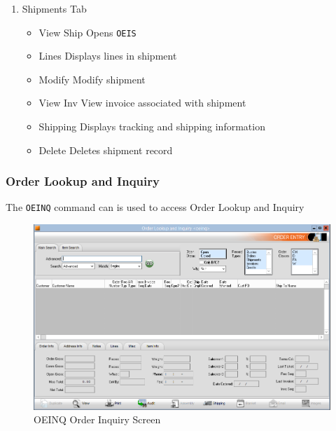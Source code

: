 \begin{enumerate}
	\item Shipments Tab
	\begin{itemize}
		\item View Ship \textemdash Opens \texttt{OEIS}
		\item Lines \textemdash Displays lines in shipment
		\item Modify \textemdash Modify shipment
		\item View Inv \textemdash View invoice associated with shipment
		\item Shipping \textemdash Displays tracking and shipping information
		\item Delete \textemdash Deletes shipment record
	\end{itemize}
\end{enumerate}

\subsubsection{Order Lookup and Inquiry}


The \texttt{OEINQ} command can is used to access Order Lookup and Inquiry

\begin{figure}[H]
	\includegraphics[width=\textwidth]{../img/image5}
	\caption{OEINQ Order Inquiry Screen}
\end{figure}

